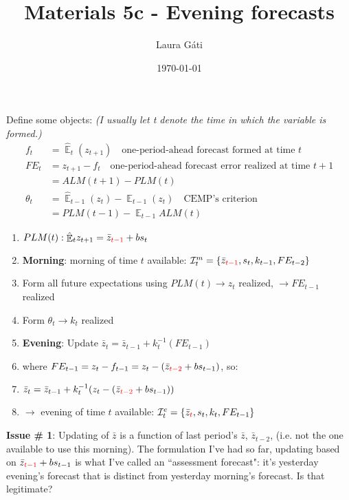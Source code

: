 \documentclass[11pt]{article}
\renewcommand{\[}{\begin{equation}}
\renewcommand{\]}{\end{equation}}
\DeclareMathOperator{\E}{\mathbb{E}}
\begin{document}
\linespread{1.0}

\title{Materials 5c - Evening forecasts}
\author{Laura G\'ati} 
\date{\today}
\maketitle




Define some objects: \emph{(I usually let t denote the time in which the variable is formed.)}
\begin{align}
f_t &= \hat{\E}_t(z_{t+1}) \quad \text{one-period-ahead forecast formed at time } t \\
FE_t & = z_{t+1}-f_t \quad \text{one-period-ahead forecast error realized at time } t+1 \\
& = ALM(t+1) - PLM(t) \\
\theta_t &=  \hat{\E}_{t-1}(z_{t}) - \E_{t-1}(z_{t}) \quad \text{CEMP's criterion} \\
& = PLM(t-1) - \E_{t-1}ALM(t)
\end{align}


\begin{enumerate}
\item[] $PLM(t): \hat{\E}_t z_{t+1} = \bar{z}_{\color{red}{t-1}} + bs_t$
\item[] \textbf{Morning}: morning of time $t$ available: $\mathcal{I}_t^m = \{\bar{z}_{\color{red}{t-1}}, s_t, k_{t-1}, FE_{t-2}\}$
\item Form all future expectations using $PLM(t) \rightarrow z_t$ realized, $\rightarrow FE_{t-1}$ realized 
\item Form $\theta_t \rightarrow k_t$ realized
\item \textbf{Evening}: Update $\bar{z}_t = \bar{z}_{t-1} + k_t^{-1}(FE_{t-1})$
\item[] where $FE_{t-1} = z_{t}-f_{t-1} = z_{t}-(\bar{z}_{\color{red}{t-2}} + bs_{t-1})$, so:
\item[] $\bar{z}_t = \bar{z}_{t-1} + k_t^{-1}(z_{t}-(\bar{z}_{\color{red}{t-2}} + bs_{t-1}))$
\item[] $\rightarrow$ evening of time $t$ available: $\mathcal{I}_t^e = \{\bar{z}_{\color{red}{t}}, s_t, k_{t}, FE_{t-1}\}$
\end{enumerate}

\textbf{Issue \# 1}: Updating of $\bar{z}$ is a function of last period's $\bar{z}$, $\bar{z}_{t-2}$, (i.e. not the one available to use this morning). The formulation I've had so far, updating based on $\bar{z}_{\color{red}{t-1}} + bs_{t-1}$ is what I've called an ``assessment forecast": it's yesterday evening's forecast that is distinct from yesterday morning's forecast. Is that legitimate?
\end{document}
